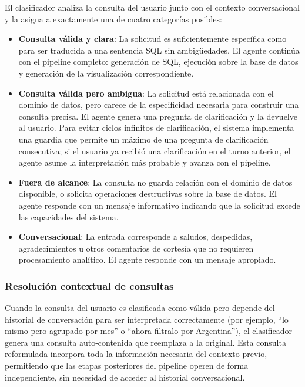 El clasificador analiza la consulta del usuario junto con el contexto
conversacional y la asigna a exactamente una de cuatro categorías posibles:

\begin{itemize}
      \item \textbf{Consulta válida y clara}: La solicitud es suficientemente
            específica como para ser traducida a una sentencia SQL sin ambigüedades. El
            agente continúa con el pipeline completo: generación de SQL, ejecución sobre
            la base de datos y generación de la visualización correspondiente.

      \item \textbf{Consulta válida pero ambigua}: La solicitud está relacionada con
            el dominio de datos, pero carece de la especificidad necesaria para construir
            una consulta precisa. El agente genera una pregunta de clarificación y la
            devuelve al usuario. Para evitar ciclos infinitos de clarificación, el sistema
            implementa una guardia que permite un máximo de una pregunta de clarificación
            consecutiva; si el usuario ya recibió una clarificación en el turno anterior,
            el agente asume la interpretación más probable y avanza con el pipeline.

      \item \textbf{Fuera de alcance}: La consulta no guarda relación con el dominio
            de datos disponible, o solicita operaciones destructivas sobre la base de
            datos. El agente responde con un mensaje informativo indicando que la
            solicitud excede las capacidades del sistema.

      \item \textbf{Conversacional}: La entrada corresponde a saludos, despedidas,
            agradecimientos u otros comentarios de cortesía que no requieren procesamiento
            analítico. El agente responde con un mensaje apropiado.
\end{itemize}

\subsubsection{Resolución contextual de consultas}

Cuando la consulta del usuario es clasificada como válida pero depende del
historial de conversación para ser interpretada correctamente (por ejemplo,
``lo mismo pero agrupado por mes'' o ``ahora filtralo por Argentina''), el
clasificador genera una consulta auto-contenida que reemplaza a la original.
Esta consulta reformulada incorpora toda la información necesaria del contexto
previo, permitiendo que las etapas posteriores del pipeline operen de forma
independiente, sin necesidad de acceder al historial conversacional.

